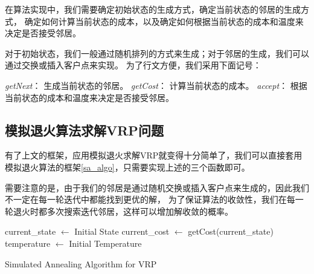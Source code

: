 在算法实现中，我们需要确定初始状态的生成方式，确定当前状态的邻居的生成方式，
确定如何计算当前状态的成本，以及确定如何根据当前状态的成本和温度来决定是否接受邻居。

对于初始状态，我们一般通过随机排列的方式来生成；对于邻居的生成，我们可以通过交换或插入客户点来实现。
为了行文方便，我们采用下面记号：

\textit{getNext}： 生成当前状态的邻居。
\textit{getCost}： 计算当前状态的成本。
\textit{accept}： 根据当前状态的成本和温度来决定是否接受邻居。

\subsection{模拟退火算法求解VRP问题}

有了上文的框架，应用模拟退火求解VRP就变得十分简单了，我们可以直接套用模拟退火算法的框架\ref{sa_algo}，只需要实现上述的三个函数即可。

需要注意的是，由于我们的邻居是通过随机交换或插入客户点来生成的，因此我们不一定在每一轮迭代中都能找到更优的解，
为了保证算法的收敛性，我们在每一轮退火时都多次搜索迭代邻居，这样可以增加解收敛的概率。

\begin{algorithm}[H]
    


    current\_state $\leftarrow$ Initial State\;
    current\_cost $\leftarrow$ getCost(current\_state)\;
    temperature $\leftarrow$ Initial Temperature\;


    \caption{Simulated Annealing Algorithm for VRP}
\end{algorithm}

